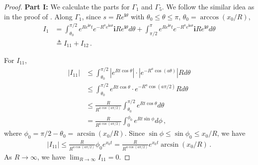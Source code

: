 \documentclass[11pt]{article}
\renewcommand{\i}{\mathbf{i}}
\begin{document}
\begin{proof}
\bigskip

{\bf Part I:} We calculate the parts for $\Gamma_1$ and $\Gamma_5$. We follow the similar idea as in the proof of \cite[Theorem 7.1]{spiegel1965laplace}. Along $\Gamma_1$, since $s=Re^{\i\theta}$ with $\theta_0\leq \theta\leq \pi$, $\theta_0=\arccos(x_0/R)$,
\begin{align*}
    I_1&=\int_{\theta_0}^{\pi/2} e^{Re^{\i\theta}t}e^{-R^a e^{\i a\theta}}\i Re^{\i\theta}d\theta+\int_{\pi/2}^{\pi} e^{Re^{\i\theta}t}e^{-R^a e^{\i a\theta}}\i Re^{\i\theta}d\theta\\
    &\triangleq I_{11}+I_{12}\,.
\end{align*}

For $I_{11}$,
\begin{align*}
    |I_{11}|&\leq \int_{\theta_0}^{\pi/2} |e^{Rt\cos\theta}|\cdot |e^{-R^a \cos(a\theta)}| R d\theta\\
    &\leq \int_{\theta_0}^{\pi/2} e^{Rt\cos\theta}\cdot e^{-R^a \cos(a\pi/2)} R d\theta\\
    &\leq \frac{R}{R^{a\cos(a\pi/2)} }\int_{\theta_0}^{\pi/2} e^{Rt\cos\theta} d\theta\\
    &= \frac{R}{R^{a\cos(a\pi/2)} }\int_{0}^{\phi_0} e^{Rt\sin\phi} d\phi\,,
\end{align*}
where $\phi_0=\pi/2-\theta_0=\arcsin(x_0/R)$. Since $\sin\phi\leq\sin\phi_0\leq x_0/R$, we have
\begin{align*}
    |I_{11}|\leq \frac{R}{R^{a\cos(a\pi/2)}}\phi_0 e^{x_0 t}=\frac{R}{R^{a\cos(a\pi/2)}} e^{x_0 t}\arcsin(x_0/R)\,.
\end{align*}
As $R\to \infty$, we have $\lim_{R\to \infty}I_{11}=0$. 


\end{proof}
\end{document}
